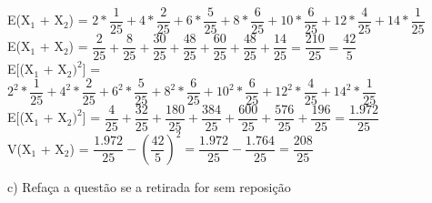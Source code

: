 \documentclass[12pt,a4paper,draft,final,oneside]{article}
\begin{document}
	\begin{center}
		\vspace{0.5cm}
		E(X$_{1}$ + X$_{2}$) = $2*\dfrac{1}{25} + 4*\dfrac{2}{25} + 6*\dfrac{5}{25} + 8*\dfrac{6}{25} + 10*\dfrac{6}{25} + 12*\dfrac{4}{25} + 14*\dfrac{1}{25}$
		\vspace{0.25cm}\\
		E(X$_{1}$ + X$_{2}$) = $\dfrac{2}{25} + \dfrac{8}{25} + \dfrac{30}{25} + \dfrac{48}{25} + \dfrac{60}{25} + \dfrac{48}{25} + \dfrac{14}{25} = \dfrac{210}{25} = \dfrac{42}{5}$
		\vspace{1cm}\\
		E[(X$_{1}$ + X$_{2})^2$] = $2^2*\dfrac{1}{25} + 4^2*\dfrac{2}{25} + 6^2*\dfrac{5}{25} + 8^2*\dfrac{6}{25} + 10^2*\dfrac{6}{25} + 12^2*\dfrac{4}{25} + 14^2*\dfrac{1}{25}$
		\vspace{0.25cm}\\
		E[(X$_{1}$ + X$_{2})^2$] = $\dfrac{4}{25} + \dfrac{32}{25} + \dfrac{180}{25} + \dfrac{384}{25} + \dfrac{600}{25} + \dfrac{576}{25} + \dfrac{196}{25} = \dfrac{1.972}{25}$
		\vspace{1cm}\\
		V(X$_{1}$ + X$_{2}$) = $\dfrac{1.972}{25} - (\dfrac{42}{5})^2 = \dfrac{1.972}{25} - \dfrac{1.764}{25} = \dfrac{208}{25}$
	\end{center}
	\vspace{1cm}
	c) Refaça a questão se a retirada for sem reposição
	\vspace{0.5cm}\\
\end{document}
